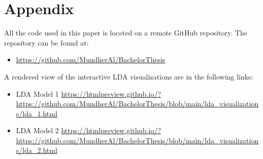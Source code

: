 \section*{Appendix}

All the code used in this paper is located on a remote GitHub repository. The repository can be found at:


\begin{itemize}
    \item \url{https://github.com/MundherAl/BachelorThesis}
\end{itemize}

A rendered view of the interactive LDA visualizations are in the following links:

\begin{itemize}
    \item LDA Model 1 \url{https://htmlpreview.github.io/?https://github.com/MundherAl/BachelorThesis/blob/main/lda_visualizations/lda_1.html}
    \item LDA Model 2 \url{https://htmlpreview.github.io/?https://github.com/MundherAl/BachelorThesis/blob/main/lda_visualizations/lda_2.html}
\end{itemize}
